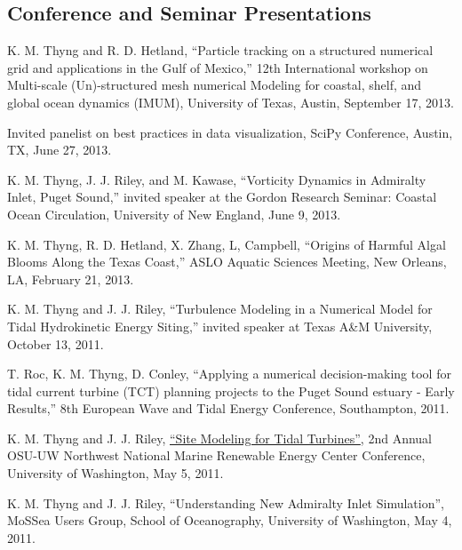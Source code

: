 \documentclass[10pt,letterpaper]{article}
\renewenvironment{itemize}{
  \begin{list}{}{
    \setlength{\leftmargin}{1.5em}
    \setlength{\itemsep}{0.25em}
    \setlength{\parskip}{0pt}
    \setlength{\parsep}{0.25em}
  }
}{
  \end{list}
}
\begin{document}
\subsection*{Conference and Seminar Presentations}

\begin{itemize}

\item K. M. Thyng and R. D. Hetland, ``Particle tracking on a structured numerical grid and applications in the Gulf of Mexico,'' 12th International workshop on Multi-scale (Un)-structured mesh numerical Modeling for coastal, shelf, and global ocean dynamics (IMUM), University of Texas, Austin, September 17, 2013.

\item Invited panelist on best practices in data visualization, SciPy Conference, Austin, TX, June 27, 2013.

\item K. M. Thyng, J. J. Riley, and M. Kawase, ``Vorticity Dynamics in Admiralty Inlet, Puget Sound,'' invited speaker at the Gordon Research Seminar: Coastal Ocean Circulation, University of New England, June 9, 2013.

\item K. M. Thyng, R. D. Hetland, X. Zhang, L, Campbell, ``Origins of Harmful Algal Blooms Along the Texas Coast,'' ASLO Aquatic Sciences Meeting, New Orleans, LA, February 21, 2013.

\item K. M. Thyng and J. J. Riley, ``Turbulence Modeling in a Numerical Model for Tidal Hydrokinetic Energy Siting,'' invited speaker at Texas A\&M University, October 13, 2011.

\item T. Roc, K. M. Thyng, D. Conley, ``Applying a numerical decision-making tool for tidal current turbine (TCT) planning projects to the Puget Sound estuary - Early Results,'' 8th European Wave and Tidal Energy Conference, Southampton, 2011.

\item K. M. Thyng and J. J. Riley, \href{http://froude.me.washington.edu/presentations/nnmrec050511.pdf}{``Site Modeling for Tidal Turbines''}, 2nd Annual OSU-UW Northwest National Marine Renewable Energy Center Conference, University of Washington, May 5, 2011.

\item K. M. Thyng and J. J. Riley, ``Understanding New Admiralty Inlet Simulation'', MoSSea Users Group, School of Oceanography, University of Washington, May 4, 2011.


\end{itemize}
\end{document}
